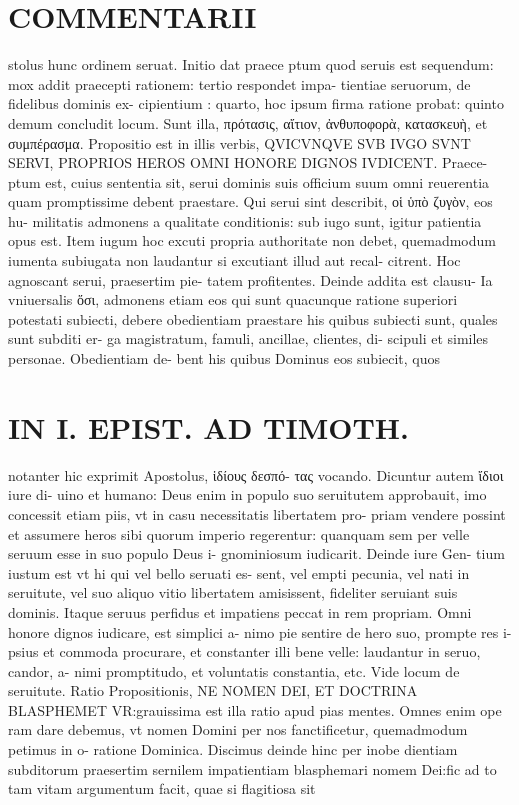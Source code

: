 \documentclass{article}
\begin{document}
\begin{pages}
\section*{COMMENTARII }
\marginpar{[ p.144 ]}\pstart stolus hunc ordinem seruat. Initio dat praece ptum quod seruis est sequendum: mox addit praecepti rationem: tertio respondet impa- tientiae seruorum, de fidelibus dominis ex- cipientium : quarto, hoc ipsum firma ratione probat: quinto demum concludit locum. Sunt illa, πρότασις, αἴτιον, ἀνθυποφορὰ, κατασκευὴ, et συμπέρασμα.  \pend\pstart Propositio est in illis verbis, QVICVNQVE SVB IVGO SVNT SERVI, PROPRIOS HEROS OMNI HONORE DIGNOS IVDICENT. Praece- ptum est, cuius sententia sit, serui dominis suis officium suum omni reuerentia quam promptissime debent praestare.  \pend\pstart Qui serui sint describit, οἱ ὑπὸ ζυγὸν, eos hu- militatis admonens a qualitate conditionis: sub iugo sunt, igitur patientia opus est. Item iugum hoc excuti propria authoritate non debet, quemadmodum iumenta subiugata non laudantur si excutiant illud aut recal- citrent. Hoc agnoscant serui, praesertim pie- tatem profitentes. Deinde addita est clausu- Ia vniuersalis ὅσι, admonens etiam eos qui sunt quacunque ratione superiori potestati subiecti, debere obedientiam praestare his quibus subiecti sunt, quales sunt subditi er- ga magistratum, famuli, ancillae, clientes, di- scipuli et similes personae. Obedientiam de- bent his quibus Dominus eos subiecit, quos  \pend
\section*{IN I. EPIST. AD TIMOTH. }
\marginpar{[ p.145 ]}\pstart notanter hic exprimit Apostolus, ἱδίους δεσπό- τας vocando. Dicuntur autem ἴδιοι iure di- uino et humano: Deus enim in populo suo seruitutem approbauit, imo concessit etiam piis, vt in casu necessitatis libertatem pro- priam vendere possint et assumere heros sibi quorum imperio regerentur: quanquam sem per velle seruum esse in suo populo Deus i- gnominiosum iudicarit. Deinde iure Gen- tium iustum est vt hi qui vel bello seruati es- sent, vel empti pecunia, vel nati in seruitute, vel suo aliquo vitio libertatem amisissent, fideliter seruiant suis dominis. Itaque seruus perfidus et impatiens peccat in rem propriam. Omni honore dignos iudicare, est simplici a- nimo pie sentire de hero suo, prompte res i- psius et commoda procurare, et constanter illi bene velle: laudantur in seruo, candor, a- nimi promptitudo, et voluntatis constantia, etc. Vide locum de seruitute.  \pend\pstart Ratio Propositionis, NE NOMEN DEI, ET DOCTRINA BLASPHEMET VR:grauissima est illa ratio apud pias mentes. Omnes enim ope ram dare debemus, vt nomen Domini per nos fanctificetur, quemadmodum petimus in o- ratione Dominica. Discimus deinde hinc per inobe dientiam subditorum praesertim sernilem impatientiam blasphemari nomem Dei:fic ad to tam vitam argumentum facit, quae si flagitiosa sit  \pend

\end{pages}
\end{document}
